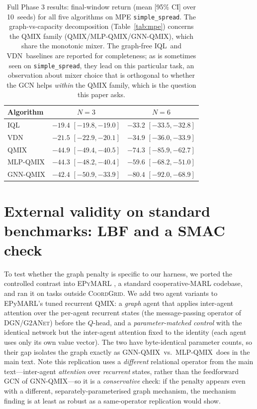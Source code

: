 \documentclass[manuscript, screen, review]{jair}
\providecommand{\citep}{\parencite}
\newcommand{\algoname}[1]{\textsc{#1}}
\newcommand{\iql}{\algoname{IQL}}
\newcommand{\vdn}{\algoname{VDN}}
\newcommand{\qmix}{\algoname{QMIX}}
\newcommand{\gnnqmix}{\algoname{GNN-QMIX}}
\newcommand{\coordgrid}{\textsc{CoordGrid}}
\newcommand{\mlpqmix}{\algoname{MLP-QMIX}}
\newcommand{\PEseeds}{10}             %
\begin{document}
\begin{table}[!ht]
  \centering
  \small
  \caption{Full Phase 3 results: final-window return (mean [95\% CI] over
  \PEseeds\ seeds) for all five algorithms on MPE \texttt{simple\_spread}.
  The graph-vs-capacity decomposition (Table~\ref{tab:mpe}) concerns the
  QMIX family (\qmix/\mlpqmix/\gnnqmix), which share the monotonic mixer.
  The graph-free \iql\ and \vdn\ baselines are reported for completeness;
  as is sometimes seen on \texttt{simple\_spread}, they lead on this
  particular task, an observation about mixer choice that is orthogonal
  to whether the GCN helps \emph{within} the QMIX family, which is the
  question this paper asks.}
  \label{tab:mpe-full}
  \begin{tabular}{lcc}
    \toprule
    Algorithm & $N=3$ & $N=6$ \\
    \midrule
    \iql     & $-19.4$ {\footnotesize $[-19.8,-19.0]$} & $-33.2$ {\footnotesize $[-33.5,-32.8]$} \\
    \vdn     & $-21.5$ {\footnotesize $[-22.9,-20.1]$} & $-34.9$ {\footnotesize $[-36.0,-33.9]$} \\
    \qmix    & $-44.9$ {\footnotesize $[-49.4,-40.5]$} & $-74.3$ {\footnotesize $[-85.9,-62.7]$} \\
    \mlpqmix & $-44.3$ {\footnotesize $[-48.2,-40.4]$} & $-59.6$ {\footnotesize $[-68.2,-51.0]$} \\
    \gnnqmix & $-42.4$ {\footnotesize $[-50.9,-33.9]$} & $-80.4$ {\footnotesize $[-92.0,-68.9]$} \\
    \bottomrule
  \end{tabular}
\end{table}

\section{External validity on standard benchmarks: LBF and a SMAC check}
\label{app:standard}

To test whether the graph penalty is specific to our harness, we ported the
controlled contrast into \textsc{EPyMARL} \citep{papoudakis_2021_benchmarking},
a standard cooperative-MARL codebase, and ran it on tasks outside \coordgrid.
We add two agent variants to EPyMARL's tuned recurrent \qmix: a \emph{graph}
agent that applies inter-agent attention over the per-agent recurrent states
(the message-passing operator of \algoname{DGN}/\algoname{G2ANet}) before the
$Q$-head, and a \emph{parameter-matched control} with the identical network but
the inter-agent attention fixed to the identity (each agent uses only its own
value vector). The two have byte-identical parameter counts, so their gap
isolates the graph exactly as \gnnqmix\ vs.\ \mlpqmix\ does in the main text.
Note this replication uses a \emph{different} relational operator from the
main text---inter-agent \emph{attention} over \emph{recurrent} states, rather
than the feedforward GCN of \gnnqmix---so it is a \emph{conservative} check:
if the penalty appears even with a different, separately-parameterised graph
mechanism, the mechanism finding is at least as robust as a same-operator
replication would show.
\end{document}
